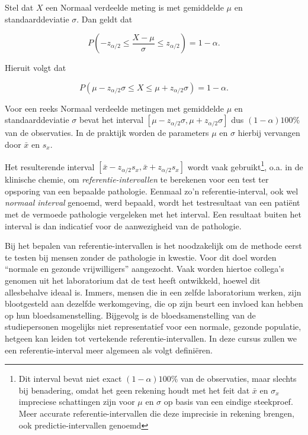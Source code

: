 \documentclass[
  dutch,
  letterpaper,
  12pt]{book}
\theoremstyle{definition}
\theoremstyle{definition}
\theoremstyle{definition}
\theoremstyle{remark}
\begin{document}
Stel dat \(X\) een Normaal verdeelde meting is met gemiddelde \(\mu\) en
standaarddeviatie \(\sigma\). Dan geldt dat

\begin{equation*}
P\left( - z_{\alpha/2}\leq \frac{X - \mu}{\sigma} \leq z_{\alpha/2}\right) =
1-\alpha .
\end{equation*}

Hieruit volgt dat

\begin{equation*}
P( \mu - z_{\alpha/2} \sigma \leq X \leq \mu + z_{\alpha/2} \sigma ) =
1-\alpha .
\end{equation*}

Voor een reeks Normaal verdeelde metingen met gemiddelde \(\mu\) en
standaarddeviatie \(\sigma\) bevat het interval
\([\mu-z_{\alpha/2}\sigma,\mu+z_{\alpha/2}\sigma]\) dus
\((1-\alpha)100\%\) van de observaties. In de praktijk worden de
parameters \(\mu\) en \(\sigma\) hierbij vervangen door \(\bar x\) en
\(s_x\).

Het resulterende interval
\([\bar x-z_{\alpha/2}s_x,\bar x+z_{\alpha/2}s_x]\) wordt vaak
gebruikt\footnote{Dit interval bevat niet exact \((1-\alpha)100\%\) van
  de observaties, maar slechts bij benadering, omdat het geen rekening
  houdt met het feit dat \(\bar x\) en \(\sigma_x\) impreciese
  schattingen zijn voor \(\mu\) en \(\sigma\) op basis van een eindige
  steekproef. Meer accurate referentie-intervallen die deze imprecisie
  in rekening brengen, ook predictie-intervallen genoemd}, o.a. in de
klinische chemie, om \emph{referentie-intervallen} te berekenen voor een
test ter opsporing van een bepaalde pathologie. Eenmaal zo'n
referentie-interval, ook wel \emph{normaal interval} genoemd, werd
bepaald, wordt het testresultaat van een patiënt met de vermoede
pathologie vergeleken met het interval. Een resultaat buiten het
interval is dan indicatief voor de aanwezigheid van de pathologie.

Bij het bepalen van referentie-intervallen is het noodzakelijk om de
methode eerst te testen bij mensen zonder de pathologie in kwestie. Voor
dit doel worden ``normale en gezonde vrijwilligers'' aangezocht. Vaak
worden hiertoe collega's genomen uit het laboratorium dat de test heeft
ontwikkeld, hoewel dit allesbehalve ideaal is. Immers, mensen die in een
zelfde laboratorium werken, zijn blootgesteld aan dezelfde werkomgeving,
die op zijn beurt een invloed kan hebben op hun bloedsamenstelling.
Bijgevolg is de bloedsamenstelling van de studiepersonen mogelijks niet
representatief voor een normale, gezonde populatie, hetgeen kan leiden
tot vertekende referentie-intervallen. In deze cursus zullen we een
referentie-interval meer algemeen als volgt definiëren.
\end{document}

